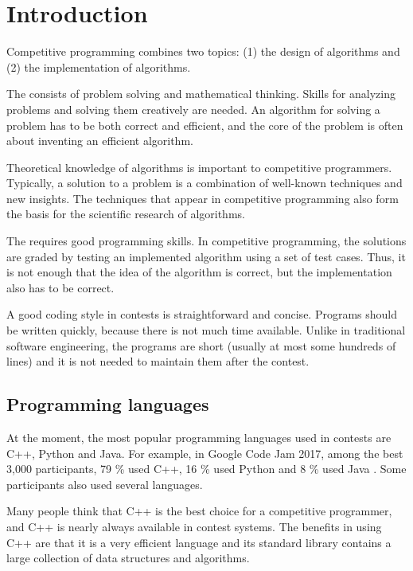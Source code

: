 \chapter{Introduction}

Competitive programming combines two topics:
(1) the design of algorithms and (2) the implementation of algorithms.

The  consists of problem solving
and mathematical thinking.
Skills for analyzing problems and solving them
creatively are needed.
An algorithm for solving a problem
has to be both correct and efficient,
and the core of the problem is often
about inventing an efficient algorithm.

Theoretical knowledge of algorithms
is important to competitive programmers.
Typically, a solution to a problem is
a combination of well-known techniques and
new insights.
The techniques that appear in competitive programming
also form the basis for the scientific research
of algorithms.

The  requires good
programming skills.
In competitive programming, the solutions
are graded by testing an implemented algorithm
using a set of test cases.
Thus, it is not enough that the idea of the
algorithm is correct, but the implementation also
has to be correct.

A good coding style in contests is
straightforward and concise.
Programs should be written quickly,
because there is not much time available.
Unlike in traditional software engineering,
the programs are short (usually at most some
hundreds of lines) and it is not needed to 
maintain them after the contest.

\section{Programming languages}


At the moment, the most popular programming
languages used in contests are C++, Python and Java.
For example, in Google Code Jam 2017,
among the best 3,000 participants,
79 \% used C++,
16 \% used Python and
8 \% used Java \cite{goo17}.
Some participants also used several languages.

Many people think that C++ is the best choice
for a competitive programmer,
and C++ is nearly always available in
contest systems.
The benefits in using C++ are that
it is a very efficient language and
its standard library contains a 
large collection
of data structures and algorithms.

